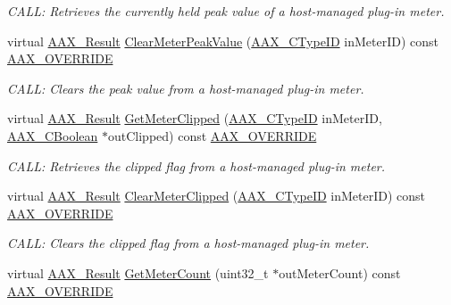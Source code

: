 \begin{DoxyCompactItemize}
\begin{DoxyCompactList}\small\item\em C\+A\+L\+L\+: Retrieves the currently held peak value of a host-\/managed plug-\/in meter. \end{DoxyCompactList}\item 
virtual \hyperlink{a00149_a4d8f69a697df7f70c3a8e9b8ee130d2f}{A\+A\+X\+\_\+\+Result} \hyperlink{a00132_aabeb939c3a94e8e2f80d25d38edbe942}{Clear\+Meter\+Peak\+Value} (\hyperlink{a00149_ac678f9c1fbcc26315d209f71a147a175}{A\+A\+X\+\_\+\+C\+Type\+I\+D} in\+Meter\+I\+D) const \hyperlink{a00149_ac2f24a5172689ae684344abdcce55463}{A\+A\+X\+\_\+\+O\+V\+E\+R\+R\+I\+D\+E}
\begin{DoxyCompactList}\small\item\em C\+A\+L\+L\+: Clears the peak value from a host-\/managed plug-\/in meter. \end{DoxyCompactList}\item 
virtual \hyperlink{a00149_a4d8f69a697df7f70c3a8e9b8ee130d2f}{A\+A\+X\+\_\+\+Result} \hyperlink{a00132_a6e76367688fec465489157e98d069a4a}{Get\+Meter\+Clipped} (\hyperlink{a00149_ac678f9c1fbcc26315d209f71a147a175}{A\+A\+X\+\_\+\+C\+Type\+I\+D} in\+Meter\+I\+D, \hyperlink{a00149_aa216506530f1d19a2965931ced2b274b}{A\+A\+X\+\_\+\+C\+Boolean} $\ast$out\+Clipped) const \hyperlink{a00149_ac2f24a5172689ae684344abdcce55463}{A\+A\+X\+\_\+\+O\+V\+E\+R\+R\+I\+D\+E}
\begin{DoxyCompactList}\small\item\em C\+A\+L\+L\+: Retrieves the clipped flag from a host-\/managed plug-\/in meter. \end{DoxyCompactList}\item 
virtual \hyperlink{a00149_a4d8f69a697df7f70c3a8e9b8ee130d2f}{A\+A\+X\+\_\+\+Result} \hyperlink{a00132_ad3b2be67ef014f316db0adafccb31c5d}{Clear\+Meter\+Clipped} (\hyperlink{a00149_ac678f9c1fbcc26315d209f71a147a175}{A\+A\+X\+\_\+\+C\+Type\+I\+D} in\+Meter\+I\+D) const \hyperlink{a00149_ac2f24a5172689ae684344abdcce55463}{A\+A\+X\+\_\+\+O\+V\+E\+R\+R\+I\+D\+E}
\begin{DoxyCompactList}\small\item\em C\+A\+L\+L\+: Clears the clipped flag from a host-\/managed plug-\/in meter. \end{DoxyCompactList}\item 
virtual \hyperlink{a00149_a4d8f69a697df7f70c3a8e9b8ee130d2f}{A\+A\+X\+\_\+\+Result} \hyperlink{a00132_af75d2290c89fc32c3ba2efcd20d6ebad}{Get\+Meter\+Count} (uint32\+\_\+t $\ast$out\+Meter\+Count) const \hyperlink{a00149_ac2f24a5172689ae684344abdcce55463}{A\+A\+X\+\_\+\+O\+V\+E\+R\+R\+I\+D\+E}

\end{DoxyCompactItemize}
